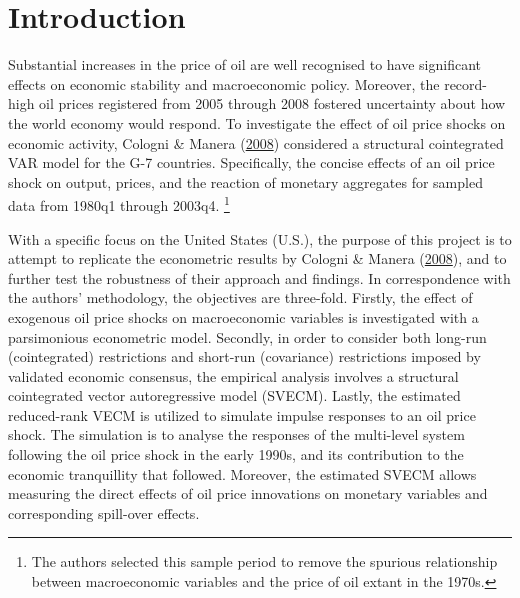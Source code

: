 \documentclass[11pt,preprint, authoryear]{elsarticle}
\numberwithin{equation}{section}
\numberwithin{figure}{section}
\numberwithin{table}{section}
\let\rmarkdownfootnote\footnote%
\def\footnote{\protect\rmarkdownfootnote}
\begin{document}

\headsep 35pt %




\hypertarget{introduction}{%
\section{\texorpdfstring{Introduction
\label{Introduction}}{Introduction }}\label{introduction}}

Substantial increases in the price of oil are well recognised to have
significant effects on economic stability and macroeconomic policy.
Moreover, the record-high oil prices registered from 2005 through 2008
fostered uncertainty about how the world economy would respond. To
investigate the effect of oil price shocks on economic activity, Cologni
\& Manera (\protect\hyperlink{ref-cologni2008}{2008}) considered a
structural cointegrated VAR model for the G-7 countries. Specifically,
the concise effects of an oil price shock on output, prices, and the
reaction of monetary aggregates for sampled data from 1980q1 through
2003q4. \footnote{The authors selected this sample period to remove the
  spurious relationship between macroeconomic variables and the price of
  oil extant in the 1970s.}

With a specific focus on the United States (U.S.), the purpose of this
project is to attempt to replicate the econometric results by Cologni \&
Manera (\protect\hyperlink{ref-cologni2008}{2008}), and to further test
the robustness of their approach and findings. In correspondence with
the authors' methodology, the objectives are three-fold. Firstly, the
effect of exogenous oil price shocks on macroeconomic variables is
investigated with a parsimonious econometric model. Secondly, in order
to consider both long-run (cointegrated) restrictions and short-run
(covariance) restrictions imposed by validated economic consensus, the
empirical analysis involves a structural cointegrated vector
autoregressive model (SVECM). Lastly, the estimated reduced-rank VECM is
utilized to simulate impulse responses to an oil price shock. The
simulation is to analyse the responses of the multi-level system
following the oil price shock in the early 1990s, and its contribution
to the economic tranquillity that followed. Moreover, the estimated
SVECM allows measuring the direct effects of oil price innovations on
monetary variables and corresponding spill-over effects.
\end{document}
